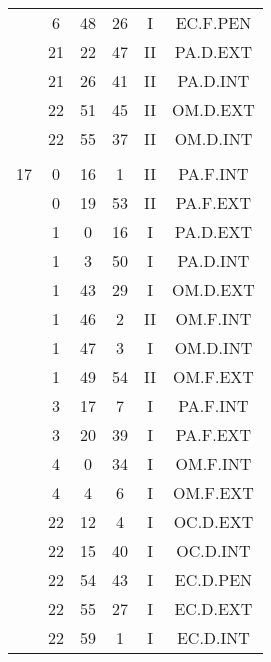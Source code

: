 \documentclass[12pt, a4paper]{article}
\begin{document}
\begin{multicols}{3}
{\begin{tabular}{c c c c c c}
	 	 	 	 & 6 & 48 & 26 & I & EC.F.PEN\\%
	 	 	 	 & 21 & 22 & 47 & II & PA.D.EXT\\%
	 	 	 	 & 21 & 26 & 41 & II & PA.D.INT\\%
	 	 	 	 & 22 & 51 & 45 & II & OM.D.EXT\\%
	 	 	 	 & 22 & 55 & 37 & II & OM.D.INT\\%
	 	 	 	 & & & & & \\%
	 	 	 	17 & 0 & 16 & 1 & II & PA.F.INT\\%
	 	 	 	 & 0 & 19 & 53 & II & PA.F.EXT\\%
	 	 	 	 & 1 & 0 & 16 & I & PA.D.EXT\\%
	 	 	 	 & 1 & 3 & 50 & I & PA.D.INT\\%
	 	 	 	 & 1 & 43 & 29 & I & OM.D.EXT\\%
	 	 	 	 & 1 & 46 & 2 & II & OM.F.INT\\%
	 	 	 	 & 1 & 47 & 3 & I & OM.D.INT\\%
	 	 	 	 & 1 & 49 & 54 & II & OM.F.EXT\\%
	 	 	 	 & 3 & 17 & 7 & I & PA.F.INT\\%
	 	 	 	 & 3 & 20 & 39 & I & PA.F.EXT\\%
	 	 	 	 & 4 & 0 & 34 & I & OM.F.INT\\%
	 	 	 	 & 4 & 4 & 6 & I & OM.F.EXT\\%
	 	 	 	 & 22 & 12 & 4 & I & OC.D.EXT\\%
	 	 	 	 & 22 & 15 & 40 & I & OC.D.INT\\%
	 	 	 	 & 22 & 54 & 43 & I & EC.D.PEN\\%
	 	 	 	 & 22 & 55 & 27 & I & EC.D.EXT\\%
	 	 	 	 & 22 & 59 & 1 & I & EC.D.INT\\%

\end{tabular}}
\end{multicols}
\end{document}
